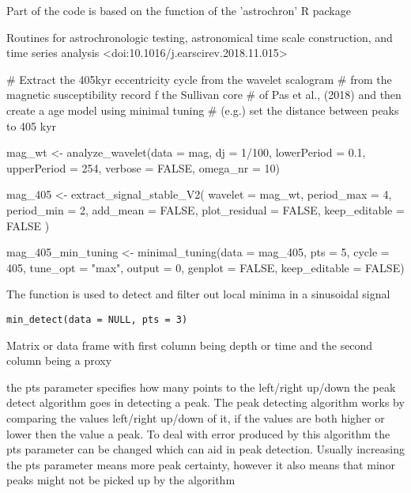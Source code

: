 \documentclass[a4paper]{book}
\begin{document}
%
\begin{Author}
Part of the code is based on the 
function of the 'astrochron' R package
\end{Author}
%
\begin{References}
Routines for astrochronologic testing, astronomical time scale construction, and
time series analysis <doi:10.1016/j.earscirev.2018.11.015>
\end{References}
%
\begin{Examples}
\begin{ExampleCode}

# Extract the 405kyr eccentricity cycle from the wavelet scalogram
# from the magnetic susceptibility record f the Sullivan core
# of Pas et al., (2018) and then create a age model using minimal tuning
# (e.g.) set the distance between peaks to 405 kyr

mag_wt <- analyze_wavelet(data = mag,
dj = 1/100,
lowerPeriod = 0.1,
upperPeriod = 254,
verbose = FALSE,
omega_nr = 10)


mag_405 <- extract_signal_stable_V2(
 wavelet = mag_wt,
 period_max = 4,
 period_min = 2,
 add_mean = FALSE,
 plot_residual = FALSE,
 keep_editable = FALSE
)

mag_405_min_tuning <- minimal_tuning(data = mag_405,
pts = 5,
cycle = 405,
tune_opt = "max",
output = 0,
genplot = FALSE,
keep_editable = FALSE)




\end{ExampleCode}
\end{Examples}
%
\begin{Description}
The  function is used to detect and
filter out local minima in a sinusoidal signal
\end{Description}
%
\begin{Usage}
\begin{verbatim}
min_detect(data = NULL, pts = 3)
\end{verbatim}
\end{Usage}
%
\begin{Arguments}
\begin{ldescription}
\item[\code{data}] Matrix or data frame with first column being depth or time and
the second column being a proxy

\item[\code{pts}] the pts parameter specifies how many points to the left/right up/down the peak detect algorithm goes in detecting
a peak. The peak detecting algorithm works by comparing the values left/right up/down of it, if the values are both higher or lower
then the value a peak. To deal with error produced by this algorithm the pts parameter can be changed which can
aid in peak detection. Usually increasing the pts parameter means more peak certainty, however it also means that minor peaks might not be
picked up by the algorithm 
\end{ldescription}
\end{Arguments}
\end{document}
